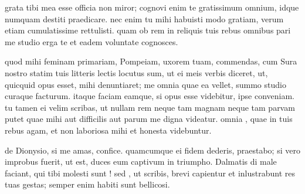 


 grata tibi mea esse officia non miror; cognovi enim te gratissimum omnium, idque numquam destiti praedicare. nec enim tu mihi habuisti modo gratiam, verum etiam cumulatissime rettulisti. quam ob rem in reliquis tuis rebus omnibus pari me studio erga te et eadem voluntate cognosces.

 quod mihi feminam primariam, Pompeiam, uxorem tuam, commendas, cum Sura nostro statim tuis litteris lectis locutus sum, ut ei meis verbis diceret, ut, quicquid opus esset, mihi denuntiaret; me omnia quae ea vellet, summo studio curaque facturum. itaque faciam eamque, si opus esse videbitur, ipse conveniam. tu tamen ei velim scribas, ut nullam rem neque tam magnam neque tam parvam putet quae mihi aut difficilis aut parum me digna videatur. omnia , quae in tuis rebus agam, et non laboriosa mihi et honesta videbuntur.

 de Dionysio, si me amas, confice. quamcumque ei fidem dederis, praestabo; si vero improbus fuerit, ut est, duces eum captivum in triumpho. Dalmatis di male faciant, qui tibi molesti sunt ! sed , ut scribis, brevi capientur et inlustrabunt res tuas gestas; semper enim habiti sunt bellicosi.

